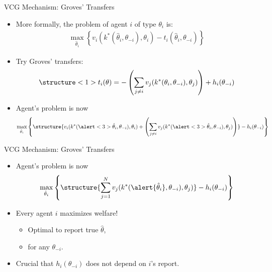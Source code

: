 \documentclass[english,10pt
,aspectratio=169
]{beamer}
\begin{document}
\begin{frame}{VCG Mechanism: Groves' Transfers}
\begin{itemize}
	\item More formally, the problem of agent $i$ of type $\theta_i$ is:
	\vspace{-0.5em}\begin{align*}
	\max_{\hat{\theta}_i} \left\{  v_i(k^*(\hat{\theta}_i,\theta_{-i}),\theta_i) - t_i(\hat{\theta}_i,\theta_{-i}) \right\}
	\end{align*}\vspace{-1em}
	\item Try \alert<1>{Groves' transfers}:
	\vspace{-0.5em}\begin{align*}
	\structure<1>{ t_{i}(\theta)=-\left(\sum_{j\neq i} v_{j}(k^*(\theta_i, \theta_{-i}), \theta_{j}) \right) + h_{i}(\theta_{-i}) }
	\end{align*}\vspace{-1em}
	\item Agent's problem is now
	\vspace{-0.5em}\begin{align*}
	\max_{\hat{\theta}_i} \left\{ \structure{v_i(k^*(\alert<3>{\hat{\theta}_i},\theta_{-i}),\theta_i) + \left( \sum_{j\neq i} v_{j}(k^*(\alert<3>{\hat{\theta}_i},\theta_{-i}), \theta_{j}) \right)} - h_{i}(\theta_{-i}) \right\}
	\end{align*}
\end{itemize}
\end{frame}


\begin{frame}{VCG Mechanism: Groves' Transfers}
\begin{itemize}
	\item Agent's problem is now
	\vspace{-0.5em}\begin{align*}
	\max_{\hat{\theta}_i} \left\{ \structure{ \sum_{j=1}^N v_{j}(k^*(\alert{\hat{\theta}_i},\theta_{-i}), \theta_{j}) } - h_{i}(\theta_{-i}) \right\}
	\end{align*}
	\item Every agent $i$ maximizes welfare!
	\begin{itemize}
		\item Optimal to report true $\hat{\theta}$,
		\item for any $\theta_{-i}$.
	\end{itemize}
	\item Crucial that $h_i(\theta_{-i})$ does not depend on $i$'s report.
\end{itemize}
\end{frame}
\end{document}
